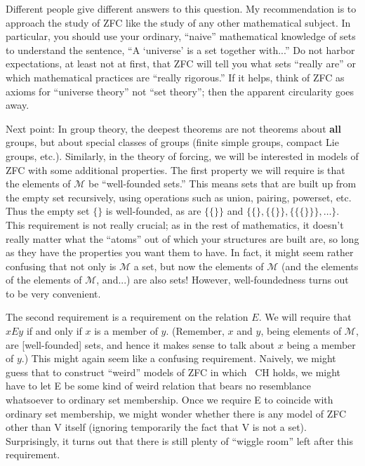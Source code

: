 \documentclass[10pt]{article}
\newcommand\axiom[1]{\textmd{#1}}
\theoremstyle{definition}
\begin{document}
Different people give different answers to this question. My recommendation is to approach the study of \axiom{ZFC} like the study of any other mathematical subject. In particular, you should use your ordinary, ``naive'' mathematical knowledge of sets to understand the sentence, ``A `universe' is a set together with...'' Do not harbor expectations, at least not at first, that \axiom{ZFC} will tell you what sets ``really are'' or which mathematical practices are ``really rigorous.'' If it helps, think of \axiom{ZFC} as axioms for ``universe theory'' not ``set theory''; then the apparent circularity goes away.

Next point: In group theory, the deepest theorems are not theorems about \textbf{all} groups, but about special classes of groups (finite simple groups, compact Lie groups, etc.). Similarly, in the theory of forcing, we will be interested in models of \axiom{ZFC} with some additional properties. The first property we will require is that the elements of $\mathcal{M}$ be ``well-founded sets.'' This means sets that are built up from the empty set recursively, using operations such as union, pairing, powerset, etc. Thus the empty set $\{\}$ is well-founded, as are $\{\{\}\}$ and $\{\{\}, \{\{\}\}, \{\{\{\}\}\}, \ldots\}$. This requirement is not really crucial; as in the rest of mathematics, it doesn't really matter what the ``atoms'' out of which your structures are built are, so long as they have the properties you want them to have. In fact, it might seem rather confusing that not only is $\mathcal{M}$ a set, but now the elements of $\mathcal{M}$ (and the elements of the elements of $\mathcal M$, and...) are also sets! However, well-foundedness turns out to be very convenient.

The second requirement is a requirement on the relation $E$. We will require that $x E y$ if and only if $x$ is a member of $y$. (Remember, $x$ and $y$, being elements of $\mathcal M$, are [well-founded] sets, and hence it makes sense to talk about $x$ being a member of $y$.) This might again seem like a confusing requirement. Naively, we might guess that to construct ``weird'' models of \axiom{ZFC} in which \axiom{~CH} holds, we might have to let E be some kind of weird relation that bears no resemblance whatsoever to ordinary set membership. Once we require E to coincide with ordinary set membership, we might wonder whether there is any model of \axiom{ZFC} other than V itself (ignoring temporarily the fact that V is not a set). Surprisingly, it turns out that there is still plenty of ``wiggle room'' left after this requirement.
\end{document}
